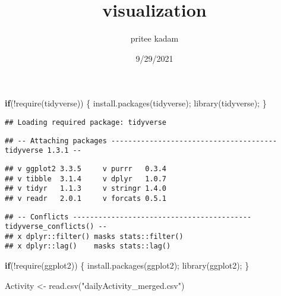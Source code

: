 \documentclass[
]{article}
\title{visualization}
\author{pritee kadam}
\date{9/29/2021}
\newenvironment{Shaded}{\begin{snugshade}}{\end{snugshade}}
\newcommand{\ControlFlowTok}[1]{\textcolor[rgb]{0.13,0.29,0.53}{\textbf{#1}}}
\newcommand{\FunctionTok}[1]{\textcolor[rgb]{0.00,0.00,0.00}{#1}}
\newcommand{\NormalTok}[1]{#1}
\newcommand{\OtherTok}[1]{\textcolor[rgb]{0.56,0.35,0.01}{#1}}
\newcommand{\SpecialCharTok}[1]{\textcolor[rgb]{0.00,0.00,0.00}{#1}}
\newcommand{\StringTok}[1]{\textcolor[rgb]{0.31,0.60,0.02}{#1}}
\begin{document}
\maketitle

\begin{Shaded}
\begin{Highlighting}[]
\ControlFlowTok{if}\NormalTok{(}\SpecialCharTok{!}\FunctionTok{require}\NormalTok{(}\StringTok{\textquotesingle{}tidyverse\textquotesingle{}}\NormalTok{))}
\NormalTok{\{}
  \FunctionTok{install.packages}\NormalTok{(}\StringTok{\textquotesingle{}tidyverse\textquotesingle{}}\NormalTok{);}
  \FunctionTok{library}\NormalTok{(tidyverse);}
\NormalTok{\}}
\end{Highlighting}
\end{Shaded}

\begin{verbatim}
## Loading required package: tidyverse
\end{verbatim}

\begin{verbatim}
## -- Attaching packages --------------------------------------- tidyverse 1.3.1 --
\end{verbatim}

\begin{verbatim}
## v ggplot2 3.3.5     v purrr   0.3.4
## v tibble  3.1.4     v dplyr   1.0.7
## v tidyr   1.1.3     v stringr 1.4.0
## v readr   2.0.1     v forcats 0.5.1
\end{verbatim}

\begin{verbatim}
## -- Conflicts ------------------------------------------ tidyverse_conflicts() --
## x dplyr::filter() masks stats::filter()
## x dplyr::lag()    masks stats::lag()
\end{verbatim}

\begin{Shaded}
\begin{Highlighting}[]
\ControlFlowTok{if}\NormalTok{(}\SpecialCharTok{!}\FunctionTok{require}\NormalTok{(}\StringTok{\textquotesingle{}ggplot2\textquotesingle{}}\NormalTok{))}
\NormalTok{\{}
  \FunctionTok{install.packages}\NormalTok{(}\StringTok{\textquotesingle{}ggplot2\textquotesingle{}}\NormalTok{);}
  \FunctionTok{library}\NormalTok{(ggplot2);}
\NormalTok{\}}
\end{Highlighting}
\end{Shaded}

\begin{Shaded}
\begin{Highlighting}[]
\NormalTok{Activity }\OtherTok{\textless{}{-}} \FunctionTok{read.csv}\NormalTok{(}\StringTok{"dailyActivity\_merged.csv"}\NormalTok{)}
\end{Highlighting}
\end{Shaded}
\end{document}
